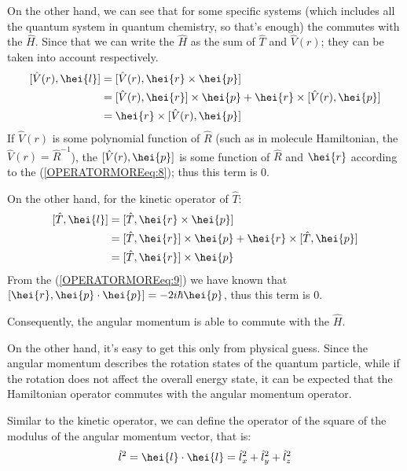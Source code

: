 On the other hand, we can see that for some specific systems (which
includes all the quantum system in quantum chemistry, so that's
enough) the  commutes with the $\hat{H}$. Since that we can
write the $\hat{H}$ as the sum of $\hat{T}$ and $\hat{V}(r)$; they
can be taken into account respectively.
\begin{align}\label{}
[\hat{V}(r), \hei{l}] &= [\hat{V}(r), \hei{r}\times\hei{p}] \nonumber \\
&=[\hat{V}(r), \hei{r}]\times\hei{p} + \hei{r}\times[\hat{V}(r), \hei{p}] \nonumber \\
&=\hei{r}\times[\hat{V}(r), \hei{p}]
\end{align}
If $\hat{V}(r)$ is some polynomial function of $\hat{R}$ (such as in
molecule Hamiltonian, the $\hat{V}(r) = \hat{R}^{-1}$), the
$[\hat{V}(r), \hei{p}]$ is some function of $\hat{R}$ and $\hei{r}$
according to the (\ref{OPERATORMOREeq:8}); thus this term is $0$.

On the other hand, for the kinetic operator of $\hat{T}$:
\begin{align}\label{}
[\hat{T}, \hei{l}] &= [\hat{T}, \hei{r}\times\hei{p}] \nonumber \\
&=[\hat{T}, \hei{r}]\times\hei{p} + \hei{r}\times[\hat{T}, \hei{p}] \nonumber \\
&=[\hat{T}, \hei{r}]\times\hei{p}
\end{align}
From the (\ref{OPERATORMOREeq:9}) we have known that $[\hei{r},
\hei{p}\cdot\hei{p}] =-2i\hbar\hei{p}$, thus this term is $0$.

Consequently, the angular momentum is able to commute with the
$\hat{H}$.

On the other hand, it's easy to get this only from physical guess.
Since the angular momentum describes the rotation states of the
quantum particle, while if the rotation does not affect the overall
energy state, it can be expected that the Hamiltonian operator
commutes with the angular momentum operator.

 Similar to the kinetic operator, we can define the operator
of the square of the modulus of the angular momentum vector, that
is:
\begin{equation}\label{}
\hat{l}^{2} = \hei{l}\cdot\hei{l} = \hat{l}^{2}_{x} +
\hat{l}^{2}_{y} + \hat{l}^{2}_{z}
\end{equation}

